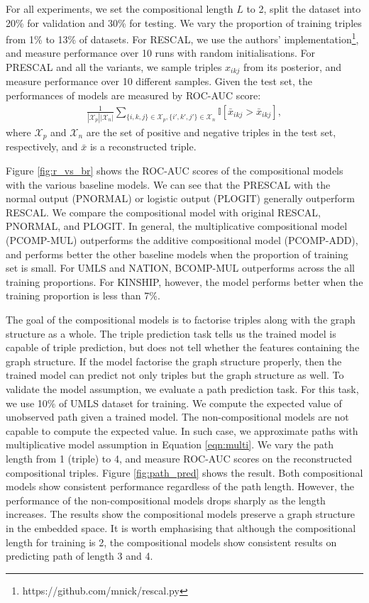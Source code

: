For all experiments, we set the compositional length $L$ to 2, split the dataset into 20\% for validation and 30\% for testing. We vary the proportion of training triples
from 1\% to 13\% of datasets. For RESCAL, we use the authors' implementation\footnote{https://github.com/mnick/rescal.py}, and measure performance over 10 runs with random initialisations. For PRESCAL and all the variants, we sample triples $x_{ikj}$ from its posterior, and measure performance over 10 different samples.
Given the test set, the performances of models are measured by ROC-AUC score:
\begin{align}
\frac{1}{|\mathcal{X}_p|  |\mathcal{X}_n|} \sum_{\{i,k,j\} \in \mathcal{X}_p, \{i',k',j'\} \in \mathcal{X}_n} \mathbb{I}[\bar{x}_{ikj} > \bar{x}_{ikj}],
\end{align}
where $\mathcal{X}_p$ and $\mathcal{X}_n$ are the set of positive and negative triples in the test set, respectively, and $\bar{x}$ is a reconstructed triple.

Figure \ref{fig:r_vs_br} shows the ROC-AUC scores of the compositional models 
with the various baseline models. We can see that the PRESCAL with 
the normal output (PNORMAL) or logistic output (PLOGIT) generally outperform RESCAL. 
We compare the compositional model with original RESCAL, PNORMAL, and PLOGIT. 
In general, the multiplicative compositional model (PCOMP-MUL) outperforms 
the additive compositional model (PCOMP-ADD), and performs better the other baseline models 
when the proportion of training set is small. For UMLS and NATION, BCOMP-MUL outperforms 
across the all training proportions. 
For KINSHIP, however, the model performs better when the training proportion is less than 7\%.

The goal of the compositional models is to factorise triples along with the graph structure as a whole. 
The triple prediction task tells us the trained model is capable of triple prediction, 
but does not tell whether the features containing the graph structure. 
If the model factorise the graph structure properly, 
then the trained model can predict not only triples but the graph structure as well. 
To validate the model assumption, we evaluate a path prediction task.
For this task, we use 10\% of UMLS dataset for training. 
We compute the expected value of unobserved path given a trained model. 
The non-compositional models are not capable to compute the expected value. 
In such case, we approximate paths with multiplicative model assumption in Equation \ref{eqn:multi}. 
We vary the path length from 1 (triple) to 4, and measure ROC-AUC scores on the reconstructed compositional triples. 
Figure \ref{fig:path_pred} shows the result. 
Both compositional models show consistent performance regardless of the path length. However, the performance of the non-compositional models drops sharply as the length increases.
The results show the compositional models preserve a graph structure in the embedded space.
It is worth emphasising that although the compositional length for training is 2, 
the compositional models show consistent results on predicting path of length 3 and 4. 

